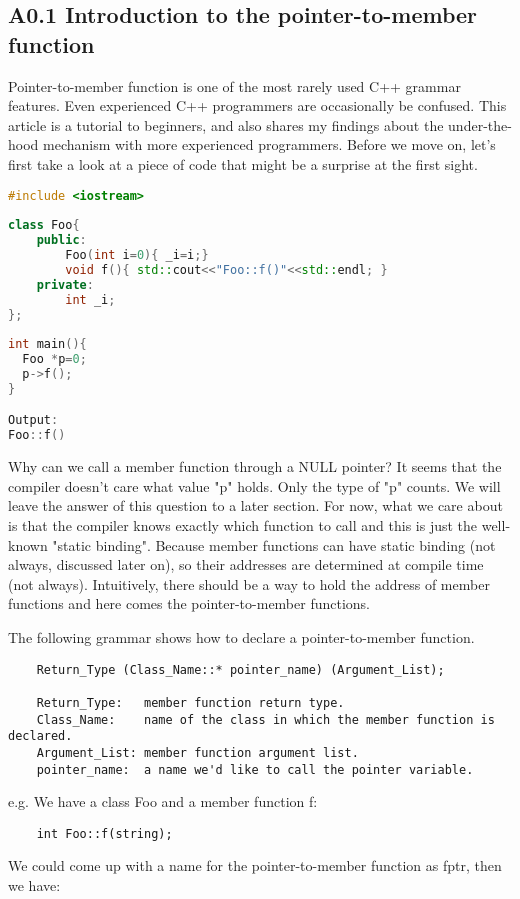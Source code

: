 \documentclass{book}
\begin{document}
\subsection{A0.1 Introduction to the pointer-to-member function}
Pointer-to-member function is one of the most rarely used C++ grammar features.  Even experienced C++ programmers are occasionally be confused. 
This article is a tutorial to beginners, and also shares my findings about the under-the-hood mechanism with more experienced programmers.
Before we move on, let's first take a look at a piece of code that might be a surprise at the first sight.
\begin{lstlisting}[caption={code 1},label={lst:a1},language=C++]
#include <iostream>
 
class Foo{
    public:
        Foo(int i=0){ _i=i;}
        void f(){ std::cout<<"Foo::f()"<<std::endl; }
    private:
        int _i;
};
 
int main(){
  Foo *p=0;
  p->f(); 
} 

Output:
Foo::f()
\end{lstlisting}
Why can we call a member function through a NULL pointer? It seems that the compiler doesn't care what value "p" holds. 
Only the type of "p" counts. 
We will leave the answer of this question to a later section.
For now, what we care about is that the compiler knows exactly which function to call and this is just the well-known "static binding".
Because member functions can have static binding (not always, discussed later on), so their addresses are determined at compile time (not always).
Intuitively, there should be a way to hold the address of member functions and here comes the pointer-to-member functions.

The following grammar shows how to declare a pointer-to-member function.
\begin{lstlisting}
    Return_Type (Class_Name::* pointer_name) (Argument_List);
     
    Return_Type:   member function return type.
    Class_Name:    name of the class in which the member function is declared.
    Argument_List: member function argument list.
    pointer_name:  a name we'd like to call the pointer variable.
\end{lstlisting}
e.g. We have a class Foo and a member function f:
\begin{lstlisting}
    int Foo::f(string);
\end{lstlisting}

We could come up with a name for the pointer-to-member function as fptr, then we have:
\end{document}
